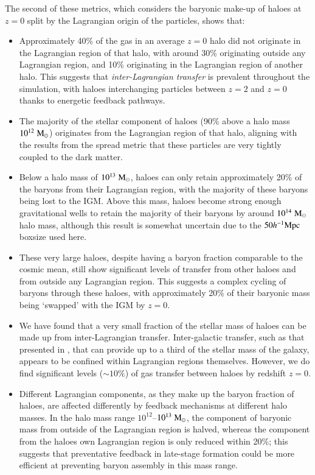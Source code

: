 The second of these metrics, which considers the baryonic make-up of haloes
at $z=0$ split by the Lagrangian origin of the particles, shows that:
\begin{itemize}
    \item Approximately 40\% of the gas in an average $z=0$ halo did not originate
          in the Lagrangian region of that halo, with around 30\% originating
          outside any Lagrangian region, and 10\% originating in the Lagrangian
          region of another halo. This suggests that \emph{inter-Lagrangian
          transfer} is prevalent throughout the simulation, with haloes interchanging
          particles between $z=2$ and $z=0$ thanks to energetic feedback pathways.
    \item The majority of the stellar component of haloes (90\% above a halo mass
          $10^{12}\;{\rm M}_{\odot}{}$) originates from the Lagrangian region of that halo,
          aligning with the results from the spread metric that these particles
          are very tightly coupled to the dark matter.
    \item Below a halo mass of $10^{13}\;{\rm M}_{\odot}{}$, haloes can only retain
          approximately 20\% of the baryons from their Lagrangian region,
          with the majority of these baryons being lost to the IGM. Above
          this mass, haloes become strong enough gravitational wells to retain
          the majority of their baryons by around $10^{14}\;{\rm M}_{\odot}{}$ halo mass,
          although this result is somewhat uncertain due to the $50h^{-1}{\rm Mpc}{}$ boxsize
          used here.
    \item These very large haloes, despite having a baryon fraction comparable
          to the cosmic mean, still show significant levels of transfer from other
          haloes and from outside any Lagrangian region. This suggests a complex
          cycling of baryons through these haloes, with approximately 20\% of their
          baryonic mass being `swapped' with the IGM by $z=0$.
    \item We have found that a very small fraction of the stellar mass of haloes
          can be made up from inter-Lagrangian transfer. Inter-galactic transfer,
          such as that presented in \citet{AnglesAlcazar2017}, that can provide
          up to a third of the stellar mass of the galaxy, appears to be confined
          within Lagrangian regions themselves. However, we do find significant levels
          ($\sim10\%$) of gas transfer between haloes by redshift $z=0$.
    \item Different Lagrangian components, as they make up the baryon
          fraction of haloes, are affected differently by feedback mechanisms at
          different halo masses. In the halo mass range
          $10^{12}$--$10^{13}\;{\rm M}_{\odot}{}$, the component of baryonic mass from
          outside of the Lagrangian region is halved, whereas the component from
          the haloes own Lagrangian region is only reduced within 20\%; this
          suggests that preventative feedback in late-stage formation could be more
          efficient at preventing baryon assembly in this mass range.
\end{itemize}
